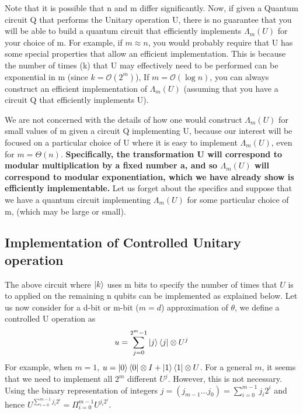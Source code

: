 \begin{importantnote}
    Note that it is possible that n and m differ significantly. Now, if given a Quantum circuit Q that performs the Unitary operation U, there is no guarantee that you will be able to build a quantum circuit that efficiently implements $\Lambda_m(U)$ for your choice of m. For example, if $m \approx n$, you would probably require that U has some special properties that allow an efficient implementation. This is because the number of times (k) that U may effectively need to be performed can be exponential in m (since $k=\mathcal{O}(2^m)$),
    If $m=\mathcal{O}(\log n)$, you can always construct an efficient implementation of $\Lambda_m(U)$ (assuming that you have a circuit Q that efficiently implements U).
    
    We are not concerned with the details of how one would construct $\Lambda_m(U)$ for small values of m given a circuit Q implementing U,
    because our interest will be focused on a particular choice of U where it is easy to implement $\Lambda_m(U)$, even for $m=\Theta(n)$.
    \textbf{Specifically, the transformation U will correspond to modular multiplication by a fixed number a, and so $\Lambda_m(U)$ will correspond to modular exponentiation, which we have already show is efficiently implementable.}
    Let us forget about the specifics and suppose that we have a quantum circuit implementing $\Lambda_m(U)$ for some particular choice of m, (which may be large or small).
\end{importantnote}

\subsection{Implementation of Controlled Unitary operation}
The above circuit where $\ket{k}$ uses m bits to specify the number of times that $U$ is to applied on the remaining n qubits can be implemented as explained below. Let us now consider for a d-bit or m-bit ($m=d$) approximation of $\theta$, we define a controlled U operation as
\[
u=\sum_{j=0}^{2^{m}-1} \ket{j}\bra{j}\otimes U^{j}
\]
For example, when $m=1$, $u=\ket{0}\bra{0}\otimes I+\ket{1}\bra{1}\otimes U$.
For a general $m$, it seems that we need to implement all $2^m$ different $U^j$. However, this is not necessary. Using the binary representation of integers $j=(j_{m-1}\ldots j_0)=\sum_{i=0}^{m-1}j_i2^i$ and hence $U^{\sum_{i=0}^{m-1}j_i2^{i}}=\Pi_{i=0}^{m-1}U^{j_i2^i}$. 

